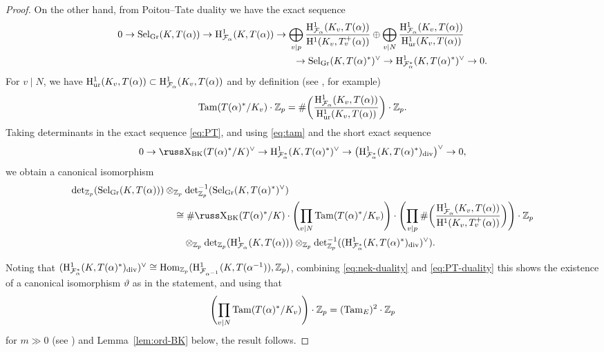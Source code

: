 \documentclass[10pt,reqno]{amsart}
\numberwithin{equation}{section}
\theoremstyle{plain}
\theoremstyle{definition}
\theoremstyle{definition}
\theoremstyle{plain}
\theoremstyle{plain}
\theoremstyle{plain}
\theoremstyle{plain}
\theoremstyle{plain}
\theoremstyle{plain}
\newcommand{\Z}{\mathbb{Z}}
\def\sha{\hbox{\russ\char88}}
\newcommand{\Fcal}{\mathcal{F}}
\newcommand{\rH}{\mathrm{H}}
\begin{document}
\begin{proof}
On the other hand, from Poitou--Tate duality we have the exact sequence
\begin{equation}\label{eq:PT}
\begin{aligned}
0\rightarrow{\rm Sel}_{\rm Gr}(K,T(\alpha))\rightarrow \rH^1_{\Fcal_\alpha}(K,T(\alpha))&\rightarrow\bigoplus_{v\mid p}\frac{\rH^1_{\Fcal_\alpha}(K_v,T(\alpha))}{\rH^1(K_v,T_v^+(\alpha))}\oplus\bigoplus_{v\mid N}\frac{\rH^1_{\Fcal_\alpha}(K_v,T(\alpha))}{\rH^1_{\rm ur}(K_v,T(\alpha))}\\
&\quad\quad\rightarrow{\rm Sel}_{\rm Gr}(K,T(\alpha)^*)^\vee\rightarrow\rH^1_{\Fcal_\alpha^*}(K,T(\alpha)^*)^\vee\rightarrow 0.
\end{aligned}
\end{equation}
For $v\mid N$, we have $\rH^1_{\rm ur}(K_v,T(\alpha))\subset \rH^1_{\Fcal_\alpha}(K_v,T(\alpha))$ and by definition (see \cite[(1.38)]{burns-flach-motivic}, for example)
\begin{equation}\label{eq:tam}
{\rm Tam}(T(\alpha)^*/K_v)\cdot\Z_p=\#\biggl(\frac{\rH^1_{\Fcal_\alpha}(K_v,T(\alpha))}{\rH^1_{\rm ur}(K_v,T(\alpha))}\biggr)\cdot\Z_p.
\end{equation} 
Taking determinants in the exact sequence \eqref{eq:PT}, and using \eqref{eq:tam} and the short exact sequence
\[
0\rightarrow\sha_{\rm BK}(T(\alpha)^*/K)^\vee\rightarrow\rH^1_{\Fcal_\alpha^*}(K,T(\alpha)^*)^\vee\rightarrow\bigl(\rH^1_{\Fcal_\alpha^*}(K,T(\alpha)^*)_{\rm div}\bigr)^\vee\rightarrow 0,
\]
we obtain a canonical isomorphism
\begin{equation}\label{eq:PT-duality}
\begin{aligned}
{\rm det}_{\Z_p}({\rm Sel}_{\rm Gr}(K,T(\alpha)))&\otimes_{\Z_p}{\rm det}_{\Z_p}^{-1}({\rm Sel}_{\rm Gr}(K,T(\alpha)^*)^\vee)\\
&\quad\cong\#\sha_{\rm BK}(T(\alpha)^*/K)\cdot\Biggl(\prod_{v\mid N}{\rm Tam}(T(\alpha)^*/K_v)\Biggr)\cdot\Biggl(\prod_{v\mid p}\#\biggl(\frac{\rH^1_{\Fcal_\alpha}(K_v,T(\alpha))}{\rH^1(K_v,T_v^+(\alpha))}\biggr)\Biggr)\cdot\Z_p\\
&\quad\quad\otimes_{\Z_p}{\rm det}_{\Z_p}(\rH^1_{\Fcal_\alpha}(K,T(\alpha)))\otimes_{\Z_p}{\rm det}_{\Z_p}^{-1}((\rH^1_{\Fcal_\alpha^*}(K,T(\alpha)^*)_{\rm div})^\vee).
\end{aligned}
\end{equation}

Noting that 
$(\rH^1_{\Fcal_\alpha^*}(K,T(\alpha)^*)_{\rm div})^\vee\cong{\rm Hom}_{\Z_p}(\rH^1_{\Fcal_{\alpha^{-1}}}(K,T(\alpha^{-1})),\Z_p)$, combining \eqref{eq:nek-duality} and \eqref{eq:PT-duality} this shows the existence of a canonical isomorphism $\vartheta$ as in the statement, and using that
\[
\Biggl(\prod_{v\mid N}{\rm Tam}(T(\alpha)^*/K_v)\Biggr)\cdot\Z_p=({\rm Tam}_E)^2\cdot\Z_p
\]
for $m\gg 0$ (see \cite[Rem.~1.2.9]{BCGS}) and Lemma~\ref{lem:ord-BK} below, the result follows.
\end{proof}
\end{document}
